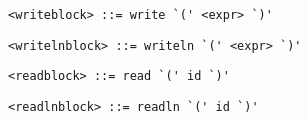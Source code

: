 \begin{footnotesize}
\begin{lstlisting}[frame=single]
<writeblock> ::= write `(' <expr> `)'
\end{lstlisting}

\begin{lstlisting}[frame=single]
<writelnblock> ::= writeln `(' <expr> `)'
\end{lstlisting}

\begin{lstlisting}[frame=single]
<readblock> ::= read `(' id `)'
\end{lstlisting}

\begin{lstlisting}[frame=single]
<readlnblock> ::= readln `(' id `)'
\end{lstlisting}
\end{footnotesize}